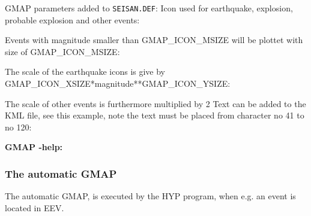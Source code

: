 GMAP parameters added to \texttt{SEISAN.DEF}: 
Icon used for earthquake, explosion, probable explosion and other events: 

\begin{small}

\end{small}

Events with magnitude smaller than GMAP\_ICON\_MSIZE will be plottet with size of GMAP\_ICON\_MSIZE: 

\begin{small}

\end{small}

The scale of the earthquake icons is give by GMAP\_ICON\_XSIZE*magnitude**GMAP\_ICON\_YSIZE: 

\begin{small}

\end{small}

The scale of other events is furthermore multiplied by 2 Text can be added to the KML file, see this example, note the text must be placed from character no 41 to no 120: 

\begin{small}

\end{small}

\textbf{GMAP -help:}

\begin{small}

\end{small}

\subsubsection{The automatic GMAP}

The automatic GMAP, is executed by the HYP program, when e.g. an event is located in EEV.

